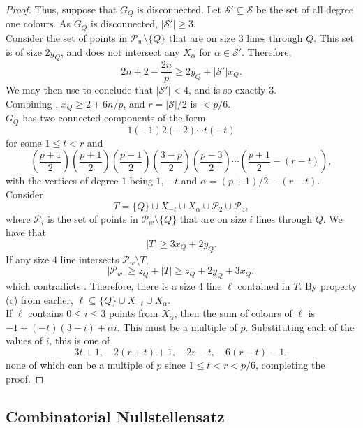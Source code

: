 \begin{proof}
		Thus, suppose that $G_Q$ is disconnected. Let $\mathcal{S}' \subseteq \mathcal{S}$ be the set of all degree one colours. As $G_Q$ is disconnected, $|\mathcal{S}'| \ge 3$.\\
		Consider the set of points in $\mathcal{P}_w \setminus \{Q\}$ that are on size $3$ lines through $Q$. This set is of size $2y_Q$, and does not intersect any $X_\alpha$ for $\alpha \in \mathcal{S}'$. Therefore,
		\begin{equation}
			\label{eqn: xQ yQ joint bound 2}
			2n + 2 - \frac{2n}{p} \ge 2 y_Q + |\mathcal{S}'| x_Q.
		\end{equation}
		We may then use  to conclude that $|\mathcal{S}'| < 4$, and is so exactly $3$.\\
		Combining , $x_Q \ge 2 + 6n/p$, and $r = |\mathcal{S}|/2$ is $< p/6$.\\
		$G_Q$ has two connected components of the form
		\[ 1 (-1) 2 (-2) \cdots t (-t) \]
		for some $1 \le t < r$ and
		\[ \left( \frac{p+1}{2} \right) \left( \frac{p+1}{2} \right) \left( \frac{p-1}{2} \right) \left( \frac{3-p}{2} \right) \left( \frac{p-3}{2} \right) \cdots \left( \frac{p+1}{2} - (r-t) \right), \]
		with the vertices of degree $1$ being $1$, $-t$ and $\alpha = (p+1)/2 - (r-t)$. Consider
		\[ T = \{Q\} \cup X_{-t} \cup X_\alpha \cup \mathcal{P}_2 \cup \mathcal{P}_3, \]
		where $\mathcal{P}_i$ is the set of points in $\mathcal{P}_w \setminus \{Q\}$ that are on size $i$ lines through $Q$. We have that
		\[ |T| \ge 3x_Q + 2y_Q. \]
		If any size $4$ line intersects $\mathcal{P}_w \setminus T$,
		\[ |\mathcal{P}_w| \ge z_Q + |T| \ge z_Q + 2y_Q + 3x_Q, \]
		which contradicts . Therefore, there is a size $4$ line $\ell$ contained in $T$. By property (c) from earlier, $\ell \subseteq \{Q\} \cup X_{-t} \cup X_\alpha$.\\
		If $\ell$ contains $0 \le i \le 3$ points from $X_\alpha$, then the sum of colours of $\ell$ is $-1 + (-t)(3-i) + \alpha i$. This must be a multiple of $p$. Substituting each of the values of $i$, this is one of
		\[ 3t+1,\quad 2(r+t)+1,\quad 2r-t,\quad 6(r-t)-1, \]
		none of which can be a multiple of $p$ since $1 \le t < r < p/6$, completing the proof.
	\end{proof}

\subsection{Combinatorial Nullstellensatz}

